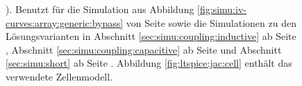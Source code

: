 \begin{figure}[h!tb]
{        ). Benutzt       f\"ur       die       Simulation       aus
        Abbildung   \ref{fig:simu:iv-curves:array:generic:bypass}  von   Seite
        \pageref{fig:simu:iv-curves:array:generic:bypass}       sowie      die
        Simulationen zu den L\"osungsvarianten in Abschnitt
        \ref{sec:simu:coupling:inductive} ab Seite
        \pageref{sec:simu:coupling:inductive}, Abschnitt
        \ref{sec:simu:coupling:capacitive} ab Seite
        \pageref{sec:simu:coupling:capacitive} und Abschnitt
        \ref{sec:simu:short} ab Seite
        \pageref{sec:simu:short}.
        Abbildung   \ref{fig:ltspice:jac:cell}    enth\"alt   das   verwendete
        Zellenmodell.%
    }
    \label{fig:ltspice:jacModule:Diode}
\end{figure}
